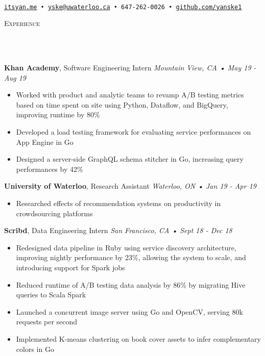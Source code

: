 \documentclass[a4paper, 11pt, hidelinks]{article}
\newcommand{\lineunder} {
    \vspace*{-8pt} \\
    \hrulefill \\
}
\newcommand{\header} [1] {
    {\hspace*{-4pt}\vspace*{6pt} \textsc{#1}}
    \vspace*{-6pt}
    \lineunder
    \vspace{6pt}
}
\begin{document}
\vspace*{-35pt}
\begin{center}
	\text{\fontsize{35}{40} \selectfont {Yan Ke}}\\
    \vspace{10pt}
    \texttt{\href{http://www.itsyan.me}{itsyan.me} • \href{mailto:yske@uwaterloo.ca}{yske@uwaterloo.ca} • 647-262-0026 •
    \href{http://www.github.com/yanske1}{github.com/yanske1}}
\end{center}
\vspace{-2pt}

\header{Experience}
\textbf{Khan Academy}, Software Engineering Intern \hfill\textit{Mountain View, CA • May 19 - Aug 19}\\
\vspace{-2mm}
\begin{itemize}[leftmargin=2em] \itemsep 1pt
    \item Worked with product and analytic teams to revamp A/B testing metrics based on time spent on site
    using Python, Dataflow, and BigQuery, improving runtime by 80\%
    \item Developed a load testing framework for evaluating service performances on App Engine in Go
    \item Designed a server-side GraphQL schema stitcher in Go, increasing query performances by 42\%
\end{itemize}

\textbf{University of Waterloo}, Research Assistant \hfill\textit{Waterloo, ON • Jan 19 - Apr 19}\\
\vspace{-2mm}
\begin{itemize}[leftmargin=2em] \itemsep 1pt
	\item Researched effects of recommendation systems on productivity in crowdsourcing platforms
\end{itemize}

\textbf{Scribd}, Data Engineering Intern \hfill\textit{San Francisco, CA • Sept 18 - Dec 18}\\
\vspace{-2mm}
\begin{itemize}[leftmargin=2em] \itemsep 1pt
	\item Redesigned data pipeline in Ruby using service discovery architecture, improving nightly performance
    by 23\%, allowing the system to scale, and introducing support for Spark jobs
	\item Reduced runtime of A/B testing data analysis by 86\% by migrating Hive queries to Scala Spark
	\item Launched a concurrent image server using Go and OpenCV, serving 80k requests per second
	\item Implemented K-means clustering on book cover assets to infer complementary colors in Go
\end{itemize}
\end{document}
